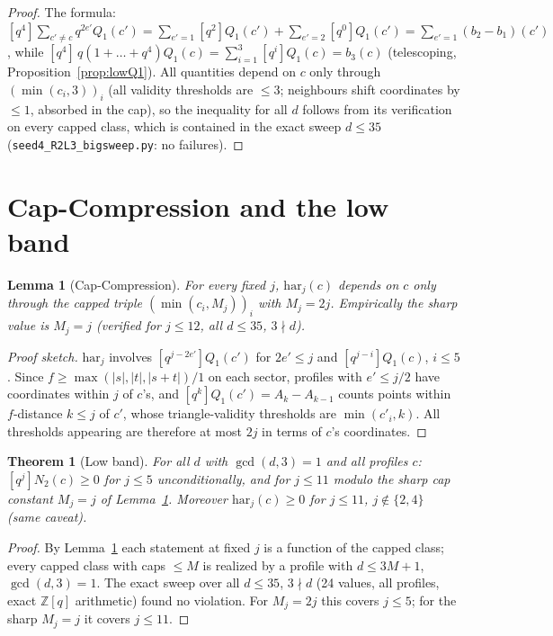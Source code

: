 \documentclass[11pt]{article}
\newtheorem{theorem}{Theorem}
\newtheorem{lemma}{Lemma}
\begin{document}
\begin{proof}
The formula: $[q^4]\sum_{c'\neq c}q^{2e'}Q_1(c') = \sum_{e'=1}[q^2]Q_1(c')
+ \sum_{e'=2}[q^0]Q_1(c') = \sum_{e'=1}(b_2-b_1)(c')$, while
$[q^4]\,q(1+\dots+q^4)Q_1(c) = \sum_{i=1}^{3}[q^i]Q_1(c) = b_3(c)$
(telescoping, Proposition~\ref{prop:lowQ1}). All quantities depend on $c$
only through $(\min(c_i,3))_i$ (all validity thresholds are $\leq 3$;
neighbours shift coordinates by $\leq 1$, absorbed in the cap), so the
inequality for all $d$ follows from its verification on every capped
class, which is contained in the exact sweep $d \leq 35$
(\texttt{seed4\_R2L3\_bigsweep.py}: no failures).
\end{proof}

\section{Cap-Compression and the low band}

\begin{lemma}[Cap-Compression]\label{lem:cap}
For every fixed $j$, $\mathrm{har}_j(c)$ depends on $c$ only through the
capped triple $(\min(c_i, M_j))_{i}$ with $M_j = 2j$. Empirically the
sharp value is $M_j = j$ (verified for $j\leq 12$, all $d\leq 35$,
$3\nmid d$).
\end{lemma}

\begin{proof}[Proof sketch]
$\mathrm{har}_j$ involves $[q^{j-2e'}]Q_1(c')$ for $2e' \leq j$ and
$[q^{j-i}]Q_1(c)$, $i\leq 5$. Since $f \geq \max(|s|,|t|,|s+t|)/1$ on
each sector, profiles with $e' \leq j/2$ have coordinates within $j$ of
$c$'s, and $[q^k]Q_1(c') = A_k - A_{k-1}$ counts points within
$f$-distance $k \leq j$ of $c'$, whose triangle-validity thresholds are
$\min(c'_i, k)$. All thresholds appearing are therefore at most $2j$ in
terms of $c$'s coordinates.
\end{proof}

\begin{theorem}[Low band]\label{thm:lowband}
For all $d$ with $\gcd(d,3)=1$ and all profiles $c$:
$[q^j] N_2(c) \geq 0$ for $j \leq 5$ unconditionally, and for $j\leq 11$
modulo the sharp cap constant $M_j=j$ of Lemma~\ref{lem:cap}. Moreover
$\mathrm{har}_j(c)\geq 0$ for $j \le 11$, $j\notin\{2,4\}$ (same caveat).
\end{theorem}

\begin{proof}
By Lemma~\ref{lem:cap} each statement at fixed $j$ is a function of the
capped class; every capped class with caps $\leq M$ is realized by a
profile with $d \leq 3M+1$, $\gcd(d,3)=1$. The exact sweep over all
$d\leq 35$, $3\nmid d$ (24 values, all profiles, exact $\mathbb{Z}[q]$
arithmetic) found no violation. For $M_j = 2j$ this covers $j\leq 5$;
for the sharp $M_j = j$ it covers $j \leq 11$.
\end{proof}
\end{document}
